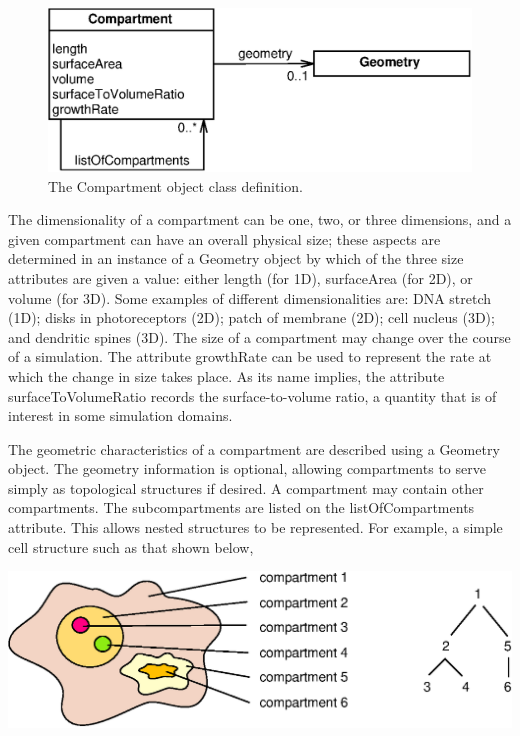 \documentclass[10pt]{article}
\newcommand{\class}[1]{\textsf{#1}}
\newcommand{\attrib}[1]{\textsf{#1}}
\begin{document}
\begin{figure}[tb]
  \centering
  \includegraphics[scale = 0.75]{compartment.eps}
  \caption{The \class{Compartment} object class definition.}
  \label{fig:compartment}
\end{figure}

The dimensionality of a compartment can be one, two, or three dimensions,
and a given compartment can have an overall physical size; these aspects
are determined in an instance of a \class{Geometry} object by which of the
three size attributes are given a value: either \attrib{length} (for 1D),
\attrib{surfaceArea} (for 2D), or \attrib{volume} (for 3D).  Some examples
of different dimensionalities are: DNA stretch (1D); disks in
photoreceptors (2D); patch of membrane (2D); cell nucleus (3D); and
dendritic spines (3D).  The size of a compartment may change over the
course of a simulation.  The attribute \attrib{growthRate} can be used to
represent the rate at which the change in size takes place.  As its name
implies, the attribute \attrib{surfaceToVolumeRatio} records the
surface-to-volume ratio, a quantity that is of interest in some simulation
domains.

The geometric characteristics of a compartment are described using a
\class{Geometry} object.  The geometry information is optional, allowing
compartments to serve simply as topological structures if desired.  A
compartment may contain other compartments.  The subcompartments are listed
on the \attrib{listOfCompartments} attribute.  This allows nested
structures to be represented.  For example, a simple cell structure such as
that shown below,

\begin{center}
  \includegraphics[scale = 0.75]{cell.eps}
\end{center}
\end{document}
